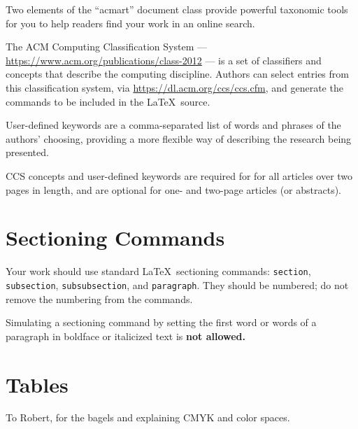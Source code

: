 \documentclass[acmtog]{acmart}
\begin{document}
Two elements of the ``acmart'' document class provide powerful
taxonomic tools for you to help readers find your work in an online
search.

The ACM Computing Classification System ---
\url{https://www.acm.org/publications/class-2012} --- is a set of
classifiers and concepts that describe the computing
discipline. Authors can select entries from this classification
system, via \url{https://dl.acm.org/ccs/ccs.cfm}, and generate the
commands to be included in the \LaTeX\ source.

User-defined keywords are a comma-separated list of words and phrases
of the authors' choosing, providing a more flexible way of describing
the research being presented.

CCS concepts and user-defined keywords are required for for all
articles over two pages in length, and are optional for one- and
two-page articles (or abstracts).

\section{Sectioning Commands}

Your work should use standard \LaTeX\ sectioning commands:
\verb|section|, \verb|subsection|, \verb|subsubsection|, and
\verb|paragraph|. They should be numbered; do not remove the numbering
from the commands.

Simulating a sectioning command by setting the first word or words of
a paragraph in boldface or italicized text is {\bfseries not allowed.}

\section{Tables}




\begin{acks}
To Robert, for the bagels and explaining CMYK and color spaces.
\end{acks}




\appendix
\end{document}
